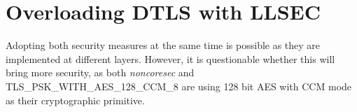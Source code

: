 \section{Overloading DTLS with LLSEC}
Adopting both security measures at the same time is possible as they are implemented at different layers. However, it is questionable whether this will bring more security, as both {\it noncoresec} and TLS\_PSK\_WITH\_AES\_128\_CCM\_8 are using 128 bit AES with CCM mode as their cryptographic primitive.
